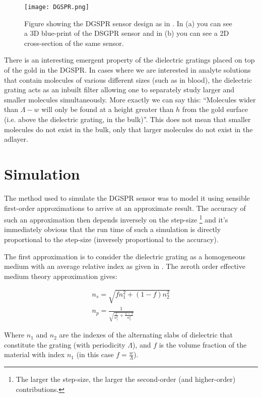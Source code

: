 \begin{figure}
\centering
\texttt{[image: DGSPR.png]}
\caption{Figure showing the DGSPR sensor design as in \cite{farshid_ol}. In (a) you can see a 3D blue-print of the DSGPR sensor and in (b) you can see a 2D cross-section of the same sensor.}
\label{fig:DGSPR}
\end{figure}

There is an interesting emergent property of the dielectric gratings placed on top of the gold in the DGSPR. In cases where we are interested in analyte solutions that contain molecules of various different sizes (such as in blood), the dielectric grating acts as an inbuilt filter allowing one to separately study larger and smaller molecules simultaneously. More exactly we can say this: ``Molecules wider than $\Lambda - w$ will only be found at a height greater than $h$ from the gold surface (i.e. above the dielectric grating, in the bulk)''. This does not mean that smaller molecules do not exist in the bulk, only that larger molecules do not exist in the adlayer. 

\section{Simulation} \label{Sim}

The method used to simulate the DGSPR sensor was to model it using sensible first-order approximations to arrive at an approximate result. The accuracy of such an approximation then depends inversely on the step-size \footnote{The larger the step-size, the larger the second-order (and higher-order) contributions.} and it's immediately obvious that the run time of such a simulation is directly proportional to the step-size (inversely proportional to the accuracy). 

The first approximation is to consider the dielectric grating as a homogeneous medium with an average 	relative index as given in \cite{app_dig_opt}. The zeroth order effective medium theory approximation gives:

\begin{eqnarray} 
n_s = \sqrt{fn_1^2 + (1-f)n_2^2} \label{EMT1}\\
n_p = \frac{1}{\sqrt{\frac{f}{n_1^2} + \frac{1-f}{n_2^2}}} \label{EMT2}
\end{eqnarray}

Where $n_1$ and $n_2$ are the indexes of the alternating slabs of dielectric that constitute the grating (with periodicity $\Lambda$), and $f$ is the volume fraction of the material with index $n_1$ (in this case $f = \frac{w}{\Lambda}$). 

